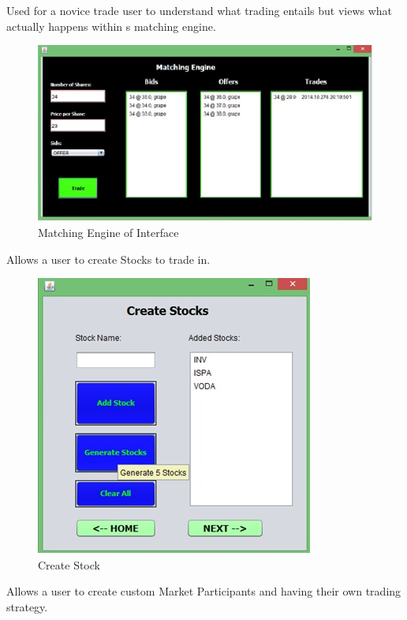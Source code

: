 \documentclass[12pt]{article}
\begin{document}
            Used for a novice trade user to understand what trading entails but views what actually happens within s matching engine.
          
            \begin{figure}[th]
            \centering
            \includegraphics[scale=0.8]{matchingengine}
            \caption{Matching Engine of Interface}
            \label{Matching Engine}
            \end{figure}
            
             Allows a user to create Stocks to trade in.

        \pagebreak
		\begin{figure}[h!]
		\centering
		\includegraphics[scale=0.8]{createstock}
		\caption{Create Stock}
		\label{Create Stock}
		\end{figure}

    Allows a user to create custom Market Participants and having their own trading strategy.
\end{document}

